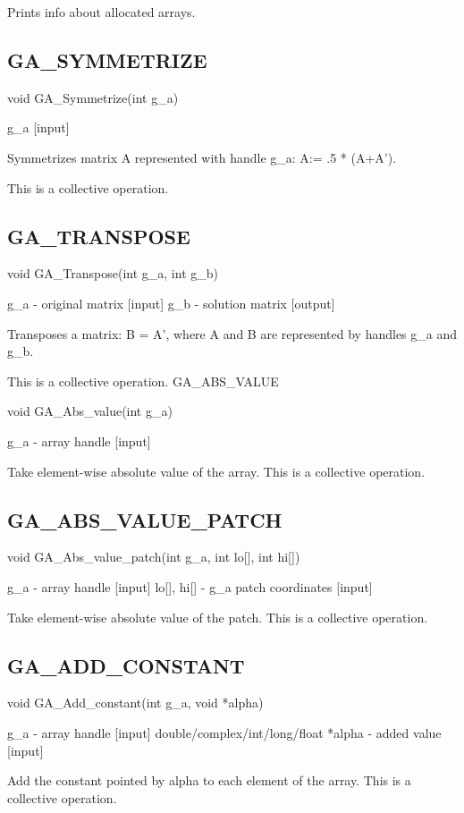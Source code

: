 Prints info about allocated arrays. 


\subsection*{GA\_SYMMETRIZE}

void GA\_Symmetrize(int g\_a)

g\_a {[}input{]}

Symmetrizes matrix A represented with handle g\_a: A:= .5 {*} (A+A').

This is a collective operation. 


\subsection*{GA\_TRANSPOSE}

void GA\_Transpose(int g\_a, int g\_b)

g\_a - original matrix {[}input{]} g\_b - solution matrix {[}output{]}

Transposes a matrix: B = A', where A and B are represented by handles
g\_a and g\_b.

This is a collective operation. GA\_ABS\_VALUE

void GA\_Abs\_value(int g\_a)

g\_a - array handle {[}input{]} 

Take element-wise absolute value of the array. This is a collective
operation.


\subsection*{GA\_ABS\_VALUE\_PATCH}

void GA\_Abs\_value\_patch(int g\_a, int lo{[}{]}, int hi{[}{]})

g\_a - array handle {[}input{]} lo{[}{]}, hi{[}{]} - g\_a patch coordinates
{[}input{]}

Take element-wise absolute value of the patch. This is a collective
operation.


\subsection*{GA\_ADD\_CONSTANT}

void GA\_Add\_constant(int g\_a, void {*}alpha)

g\_a - array handle {[}input{]} double/complex/int/long/float {*}alpha
- added value {[}input{]}

Add the constant pointed by alpha to each element of the array. This
is a collective operation. 


